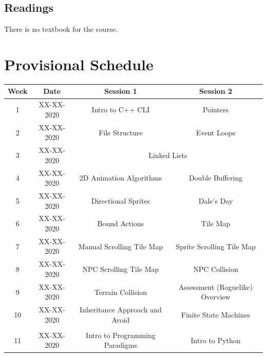 \documentclass{article}
\begin{document}
\subsection*{Readings}
There is no textbook for the course.

\section*{Provisional Schedule}

\renewcommand{\arraystretch}{1.5}
\begin{tabular}{|c|c|c|c|}
  \hline
  \textbf{Week} & \textbf{Date} & \textbf{Session 1}             & \textbf{Session 2}                         \\ \hline
  1             & XX-XX-2020    & Intro to C++ CLI               & Pointers                                   \\ \hline
  2             & XX-XX-2020    & File Structure                 & Event Loops                                \\ \hline
  3             & XX-XX-2020    & \multicolumn{2}{c|}{Linked Lists}                                           \\ \hline
  4             & XX-XX-2020    & 2D Animation Algorithms        & Double Buffering                           \\ \hline
  5             & XX-XX-2020    & Directional Sprites            & \cellcolor{yellow} Dale's Day              \\ \hline
  6             & XX-XX-2020    & Bound Actions                  & Tile Map                                   \\ \hline
  7             & XX-XX-2020    & Manual Scrolling Tile Map      & Sprite Scrolling Tile Map                  \\ \hline
  8             & XX-XX-2020    & NPC Scrolling Tile Map         & NPC Collision                              \\ \hline
  9             & XX-XX-2020    & Terrain Collision              & Assessment (Roguelike) Overview            \\ \hline
  10            & XX-XX-2020    & Inheritance Approach and Avoid & Finite State Machines                      \\ \hline
  \rowcolor{yellow} \multicolumn{4}{|c|}{Mid Term Break}                                                      \\ \hline
  11            & XX-XX-2020    & Intro to Programming Paradigms & Intro to Python                            \\ \hline

\end{tabular}
\end{document}
